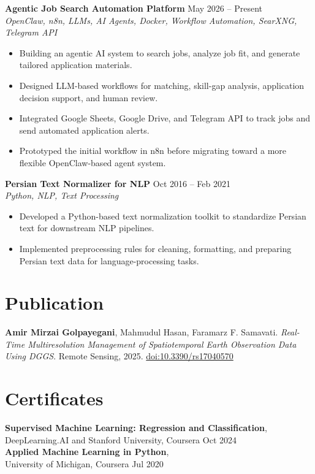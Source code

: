\documentclass[a4paper,10pt]{article}
\begin{document}
\noindent
\textbf{Agentic Job Search Automation Platform} \hfill May 2026 -- Present \\
\textit{OpenClaw, n8n, LLMs, AI Agents, Docker, Workflow Automation, SearXNG, Telegram API}
\begin{itemize}[leftmargin=0.25in]
    \item Building an agentic AI system to search jobs, analyze job fit, and generate tailored application materials.
    \item Designed LLM-based workflows for matching, skill-gap analysis, application decision support, and human review.
    \item Integrated Google Sheets, Google Drive, and Telegram API to track jobs and send automated application alerts.
    \item Prototyped the initial workflow in n8n before migrating toward a more flexible OpenClaw-based agent system.
\end{itemize}

\noindent
\textbf{Persian Text Normalizer for NLP} \hfill Oct 2016 -- Feb 2021 \\
\textit{Python, NLP, Text Processing}
\begin{itemize}[leftmargin=0.25in]
    \item Developed a Python-based text normalization toolkit to standardize Persian text for downstream NLP pipelines.
    \item Implemented preprocessing rules for cleaning, formatting, and preparing Persian text data for language-processing tasks.
\end{itemize}

\section*{Publication}

\textbf{Amir Mirzai Golpayegani}, Mahmudul Hasan, Faramarz F. Samavati. 
\textit{Real-Time Multiresolution Management of Spatiotemporal Earth Observation Data Using DGGS}. 
Remote Sensing, 2025. \href{https://doi.org/10.3390/rs17040570}{doi:10.3390/rs17040570}


\section*{Certificates}

\textbf{Supervised Machine Learning: Regression and Classification},\\
DeepLearning.AI and Stanford University, Coursera 
\hfill Oct 2024 \\
\textbf{Applied Machine Learning in Python},\\
University of Michigan, Coursera 
\hfill Jul 2020
\end{document}
